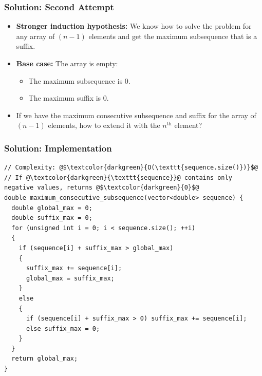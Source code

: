 \documentclass{beamer}
\begin{document}
\begin{frame}
\frametitle{Solution: Second Attempt}

\begin{itemize}

\item \textbf{Stronger induction hypothesis:} We know how to solve the problem for any array of $(n-1)$ elements and get
the maximum subsequence that is a suffix.
\vspace{0.2cm}

\item<2-> \textbf{Base case:} The array is empty:
\begin{itemize}
\item The maximum subsequence is $0$.
\item The maximum suffix is $0$.
\end{itemize}

\item<3-> If we have the maximum consecutive subsequence and suffix for the array of $(n-1)$ elements, how to extend it with the
$n^{\textrm{th}}$ element?

\begin{center}
\end{center}

\end{itemize}

\end{frame}

\begin{frame}[containsverbatim]
\frametitle{Solution: Implementation}

\scriptsize
\begin{lstlisting}
// Complexity: @$\textcolor{darkgreen}{O(\texttt{sequence.size()})}$@
// If @\textcolor{darkgreen}{\texttt{sequence}}@ contains only negative values, returns @$\textcolor{darkgreen}{0}$@
double maximum_consecutive_subsequence(vector<double> sequence) {
  double global_max = 0;
  double suffix_max = 0;
  for (unsigned int i = 0; i < sequence.size(); ++i)
  {
    if (sequence[i] + suffix_max > global_max)
    {
      suffix_max += sequence[i];
      global_max = suffix_max;
    }
    else
    {
      if (sequence[i] + suffix_max > 0) suffix_max += sequence[i];
      else suffix_max = 0;
    }
  }
  return global_max;
}
\end{lstlisting}
\end{frame}
\end{document}
